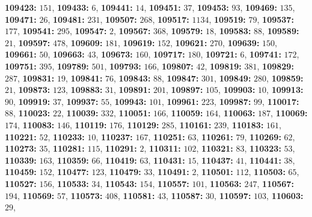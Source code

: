\textsf{\bfseries 109423:} $151$, \textsf{\bfseries 109433:} $6$, \textsf{\bfseries 109441:} $14$, \textsf{\bfseries 109451:} $37$, \textsf{\bfseries 109453:} $93$, \textsf{\bfseries 109469:} $135$, \textsf{\bfseries 109471:} $26$, \textsf{\bfseries 109481:} $231$, \textsf{\bfseries 109507:} $268$, \textsf{\bfseries 109517:} $1134$, \textsf{\bfseries 109519:} $79$, \textsf{\bfseries 109537:} $177$, \textsf{\bfseries 109541:} $295$, \textsf{\bfseries 109547:} $2$, \textsf{\bfseries 109567:} $368$, \textsf{\bfseries 109579:} $18$, \textsf{\bfseries 109583:} $88$, \textsf{\bfseries 109589:} $21$, \textsf{\bfseries 109597:} $478$, \textsf{\bfseries 109609:} $181$, \textsf{\bfseries 109619:} $152$, \textsf{\bfseries 109621:} $270$, \textsf{\bfseries 109639:} $150$, \textsf{\bfseries 109661:} $50$, \textsf{\bfseries 109663:} $43$, \textsf{\bfseries 109673:} $160$, \textsf{\bfseries 109717:} $180$, \textsf{\bfseries 109721:} $6$, \textsf{\bfseries 109741:} $172$, \textsf{\bfseries 109751:} $395$, \textsf{\bfseries 109789:} $501$, \textsf{\bfseries 109793:} $166$, \textsf{\bfseries 109807:} $42$, \textsf{\bfseries 109819:} $381$, \textsf{\bfseries 109829:} $287$, \textsf{\bfseries 109831:} $19$, \textsf{\bfseries 109841:} $76$, \textsf{\bfseries 109843:} $88$, \textsf{\bfseries 109847:} $301$, \textsf{\bfseries 109849:} $280$, \textsf{\bfseries 109859:} $21$, \textsf{\bfseries 109873:} $123$, \textsf{\bfseries 109883:} $31$, \textsf{\bfseries 109891:} $201$, \textsf{\bfseries 109897:} $105$, \textsf{\bfseries 109903:} $10$, \textsf{\bfseries 109913:} $90$, \textsf{\bfseries 109919:} $37$, \textsf{\bfseries 109937:} $55$, \textsf{\bfseries 109943:} $101$, \textsf{\bfseries 109961:} $223$, \textsf{\bfseries 109987:} $99$, \textsf{\bfseries 110017:} $88$, \textsf{\bfseries 110023:} $22$, \textsf{\bfseries 110039:} $332$, \textsf{\bfseries 110051:} $166$, \textsf{\bfseries 110059:} $164$, \textsf{\bfseries 110063:} $187$, \textsf{\bfseries 110069:} $174$, \textsf{\bfseries 110083:} $146$, \textsf{\bfseries 110119:} $176$, \textsf{\bfseries 110129:} $285$, \textsf{\bfseries 110161:} $239$, \textsf{\bfseries 110183:} $161$, \textsf{\bfseries 110221:} $52$, \textsf{\bfseries 110233:} $10$, \textsf{\bfseries 110237:} $167$, \textsf{\bfseries 110251:} $63$, \textsf{\bfseries 110261:} $79$, \textsf{\bfseries 110269:} $62$, \textsf{\bfseries 110273:} $35$, \textsf{\bfseries 110281:} $115$, \textsf{\bfseries 110291:} $2$, \textsf{\bfseries 110311:} $102$, \textsf{\bfseries 110321:} $83$, \textsf{\bfseries 110323:} $53$, \textsf{\bfseries 110339:} $163$, \textsf{\bfseries 110359:} $66$, \textsf{\bfseries 110419:} $63$, \textsf{\bfseries 110431:} $15$, \textsf{\bfseries 110437:} $41$, \textsf{\bfseries 110441:} $38$, \textsf{\bfseries 110459:} $152$, \textsf{\bfseries 110477:} $123$, \textsf{\bfseries 110479:} $33$, \textsf{\bfseries 110491:} $2$, \textsf{\bfseries 110501:} $112$, \textsf{\bfseries 110503:} $65$, \textsf{\bfseries 110527:} $156$, \textsf{\bfseries 110533:} $34$, \textsf{\bfseries 110543:} $154$, \textsf{\bfseries 110557:} $101$, \textsf{\bfseries 110563:} $247$, \textsf{\bfseries 110567:} $194$, \textsf{\bfseries 110569:} $57$, \textsf{\bfseries 110573:} $408$, \textsf{\bfseries 110581:} $43$, \textsf{\bfseries 110587:} $30$, \textsf{\bfseries 110597:} $103$, \textsf{\bfseries 110603:} $29$, 
